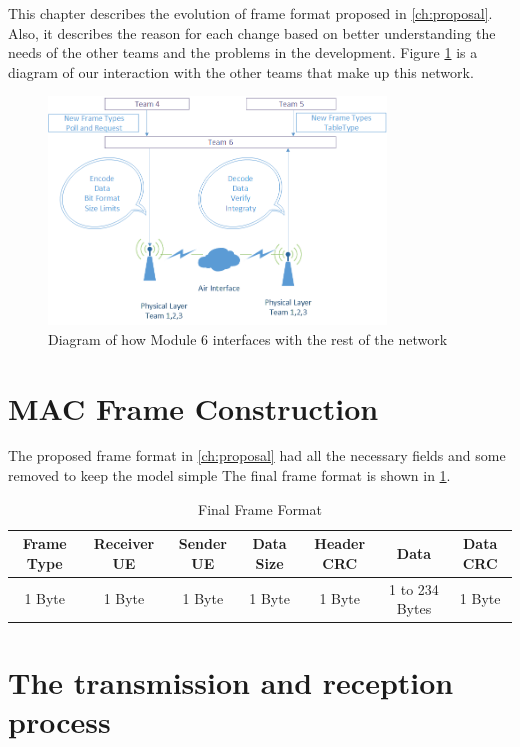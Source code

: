 This chapter describes the evolution of frame format proposed in \ref{ch:proposal}. Also, it describes the reason for each change based on better understanding the needs of the other teams and the problems in the development. Figure \ref{fig:Interface} is a diagram of our interaction with the other teams that make up this network. 
\begin{figure}[ht]
    \centering
    \includegraphics[width=0.8\textwidth]{Interface_diagram.PNG}
    \caption{Diagram of how Module 6 interfaces with the rest of the network}
    \label{fig:Interface}
\end{figure}


\section{MAC Frame Construction}
The proposed frame format in \ref{ch:proposal} had all the necessary fields and some removed to keep the model simple
The final frame format is  shown in \ref{tab:finalFrame}.

\begin{table}
\begin{tabular}{| c | c | c | c | c | c | c | }
  \hline                       
  Frame Type & Receiver UE & Sender UE & Data Size & Header CRC & Data & Data CRC\\
  \hline
	1 Byte & 1 Byte & 1 Byte & 1 Byte & 1 Byte & 1 to 234 Bytes & 1 Byte\\
  
  \hline  
\end{tabular}
 \caption{Final Frame Format}
	\label{tab:finalFrame}
\end{table}

\section{The transmission and reception process}

